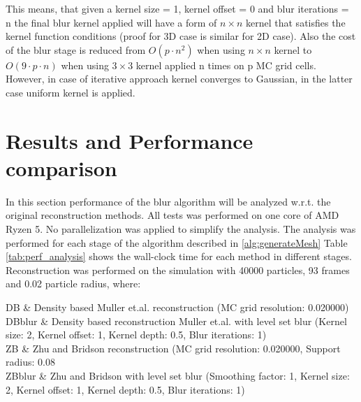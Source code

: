 This means, that given a kernel size = 1, kernel offset = 0 and blur iterations = n the final blur kernel applied will have a form of $ n \times n$ kernel that satisfies the kernel function conditions (proof for 3D case is similar for 2D case). Also the cost of the blur stage is reduced from $O(p \cdot n^2)$ when using $n \times n$ kernel to $O(9 \cdot p \cdot n)$ when using $3\times 3$ kernel applied n times on p MC grid cells. However, in  case of iterative approach kernel converges to Gaussian, in the latter case uniform kernel is applied. 


\section{Results and Performance comparison}
In this section performance of the blur algorithm will be analyzed w.r.t. the original reconstruction methods. All tests was performed on one core of AMD Ryzen 5. No parallelization was applied to simplify the analysis. The analysis was performed for each stage of the algorithm described in \ref{alg:generateMesh} 
Table \ref{tab:perf_analysis} shows the wall-clock time for each method in different stages.
Reconstruction was performed on the simulation with 40000 particles, 93 frames and 0.02 particle radius, where:
\begin{conditions}
	DB & Density based Muller et.al. reconstruction (MC grid resolution: 0.020000)\\
	DBblur & Density based reconstruction Muller et.al. with level set blur (Kernel size: 2, Kernel offset: 1, Kernel depth: 0.5, Blur iterations: 1)\\
	ZB & Zhu and Bridson reconstruction (MC grid resolution: 0.020000, Support radius: 0.08\\
	ZBblur & Zhu and Bridson with level set blur (Smoothing factor: 1, Kernel size: 2, Kernel offset: 1, Kernel depth: 0.5, Blur iterations: 1)\\
\end{conditions}
